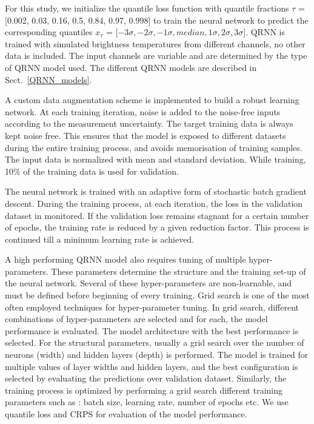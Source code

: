 \documentclass[amt, manuscript]{copernicus}
\begin{document}
For this study, we initialize the quantile loss function with quantile fractions $\tau$ = [0.002, 0.03, 0.16, 0.5, 0.84, 0.97, 0.998] to train the neural network to predict the corresponding quantiles $x_{\tau}$ = [$-3\sigma, -2\sigma, -1\sigma, median, 1\sigma, 2\sigma, 3\sigma $]. QRNN is trained with simulated brightness temperatures from different channels, no other data is included. The input channels are variable and are determined by the type of QRNN model used. The different QRNN models are described in Sect.~\ref{QRNN_models}. 

A custom data augmentation scheme is implemented to build a robust learning network. At each training iteration, noise is added to the noise-free inputs according to the measurement uncertainty. The target training data is always kept noise free. This ensures that the model is exposed to different datasets during the entire training process, and avoids memorisation of training samples. The input data is normalized with mean and standard deviation. While training, 10\% of the training data is used for validation.
 
The neural network is trained with an adaptive form of stochastic batch gradient descent. During the training process, at each iteration, the loss in the validation dataset in monitored. If the validation loss remains stagnant for a certain number of epochs, the training rate is reduced  by a given reduction factor. This process is continued till a minimum learning rate is achieved.  

A high performing QRNN model also requires tuning of multiple hyper-parameters. These parameters determine the structure and the training set-up of the neural network. Several of these hyper-parameters are non-learnable, and must be defined before beginning of every training. Grid search is one of the most often employed techniques for hyper-parameter tuning. In grid search, different combinations of hyper-parameters are selected and for each, the model performance is evaluated. The model architecture with the best performance is selected. For the structural parameters, usually a grid search over the number of neurons (width) and hidden layers (depth) is performed. The model is trained for multiple values of layer widths and hidden layers, and the best configuration is selected by evaluating the predictions over validation dataset. Similarly, the training process is optimized by performing a grid search different training parameters such as : batch size, learning rate, number of epochs etc. We use quantile loss and CRPS for evaluation of the model performance. 
\end{document}
